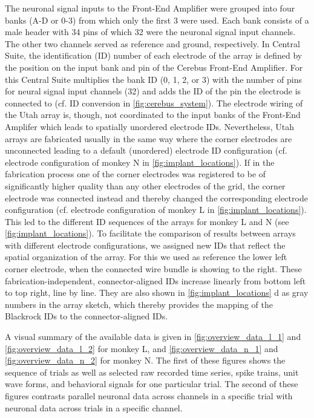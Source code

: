 {The neuronal signal inputs to the Front-End Amplifier were grouped into four banks (A-D or 0-3) from which only the first 3 were used. Each bank consists of a male header with 34 pins of which 32 were the neuronal signal input channels. The other two channels served as reference and ground, respectively. In Central Suite, the identification (ID) number of each electrode of the array is defined by the position on the input bank and pin of the Cerebus Front-End Amplifier. For this Central Suite multiplies the bank ID (0, 1, 2, or 3) with the number of pins for neural signal input channels (32) and adds the ID of the pin the electrode is connected to (cf. ID conversion in \cref{fig:cerebus_system}). The electrode wiring of the Utah array is, though, not coordinated to the input banks of the Front-End Amplifer which leads to spatially unordered electrode IDs. Nevertheless, Utah arrays are fabricated usually in the same way where the corner electrodes are unconnected leading to a default (unordered) electrode ID configuration (cf. electrode configuration of monkey N in \cref{fig:implant_locations}). If in the fabrication process one of the corner electrodes was registered to be of significantly higher quality than any other electrodes of the grid, the corner electrode was connected instead and thereby changed the corresponding electrode configuration (cf. electrode configuration of monkey L in \cref{fig:implant_locations}). This led to the different ID sequences of the arrays for monkey L and N (see \cref{fig:implant_locations}). To facilitate the comparison of results between arrays with different electrode configurations, we assigned new IDs that reflect the spatial organization of the array. For this we used as reference the lower left corner electrode, when the connected wire bundle is showing to the right. These fabrication-independent, connector-aligned IDs increase linearly from bottom left to top right, line by line. They are also shown in \cref{fig:implant_locations} d as gray numbers in the array sketch, which thereby provides the mapping of the Blackrock IDs to the connector-aligned IDs. 

A visual summary of the available data is given in \cref{fig:overview_data_l_1} and \cref{fig:overview_data_l_2}  for monkey L, and \cref{fig:overview_data_n_1} and \cref{fig:overview_data_n_2} for monkey N. The first of these figures shows the sequence of trials as well as selected raw recorded time series, spike trains, unit wave forms, and behavioral signals for one particular trial. The second of these figures contrasts parallel neuronal data across channels in a specific trial with neuronal data across trials in a specific channel.


}
